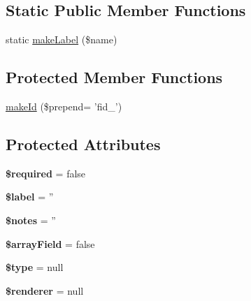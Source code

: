 \subsection*{Static Public Member Functions}
\begin{DoxyCompactItemize}
\item 
static \hyperlink{classTk_1_1Form_1_1Field_1_1Iface_a3e56843fc0f56856485f5b99c59e7425}{make\+Label} (\$name)
\end{DoxyCompactItemize}
\subsection*{Protected Member Functions}
\begin{DoxyCompactItemize}
\item 
\hyperlink{classTk_1_1Form_1_1Field_1_1Iface_acae9d96d10be302b5af48f2ae11633a9}{make\+Id} (\$prepend= 'fid\+\_\+')
\end{DoxyCompactItemize}
\subsection*{Protected Attributes}
\begin{DoxyCompactItemize}
\item 
\hypertarget{classTk_1_1Form_1_1Field_1_1Iface_a99321b47c888e922b1b269ab3da819e6}{{\bfseries \$required} = false}\label{classTk_1_1Form_1_1Field_1_1Iface_a99321b47c888e922b1b269ab3da819e6}

\item 
\hypertarget{classTk_1_1Form_1_1Field_1_1Iface_aa217965a0440d30fb8c2e0ef752e8ac8}{{\bfseries \$label} = ''}\label{classTk_1_1Form_1_1Field_1_1Iface_aa217965a0440d30fb8c2e0ef752e8ac8}

\item 
\hypertarget{classTk_1_1Form_1_1Field_1_1Iface_a8befa24f089af49b07f96fc58d0942cc}{{\bfseries \$notes} = ''}\label{classTk_1_1Form_1_1Field_1_1Iface_a8befa24f089af49b07f96fc58d0942cc}

\item 
\hypertarget{classTk_1_1Form_1_1Field_1_1Iface_a293a78923c3f075d7da5e35222de0fbb}{{\bfseries \$array\+Field} = false}\label{classTk_1_1Form_1_1Field_1_1Iface_a293a78923c3f075d7da5e35222de0fbb}

\item 
\hypertarget{classTk_1_1Form_1_1Field_1_1Iface_a0006eca554e380975397befac780bf22}{{\bfseries \$type} = null}\label{classTk_1_1Form_1_1Field_1_1Iface_a0006eca554e380975397befac780bf22}

\item 
\hypertarget{classTk_1_1Form_1_1Field_1_1Iface_a4c412caeb92991d723730df7cb2e20b6}{{\bfseries \$renderer} = null}\label{classTk_1_1Form_1_1Field_1_1Iface_a4c412caeb92991d723730df7cb2e20b6}

\end{DoxyCompactItemize}


